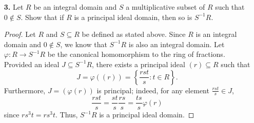 \documentclass[ 12pt ]{article}
\begin{document}
\begin{enumerate}
\begin{proof}
\begin{enumerate}
				Suppose by contradiction that $I = (x)$ where $x \in R$. It must hold that there exist $y, z \in R$ such that $$xy = 2\;\;\; \mathrm{and}\;\;\; xz = 1 + i\sqrt{5}.$$ Recall that the only units of $R$ are $-1$ and $1$. If $x$ is not unital, then $y$ and $z$ must be units; however, this implies that $$|x| = 2\;\;\; \mathrm{and}\;\;\; |x| = \sqrt{6}.$$ Hence, $x$ is a unit, yet $I \neq R$; indeed, using elementary arguments as utilized above would illustrate that $3 \notin I$, contradicting the fact that $I = (x) = R$.

				\item[\textbf{b.}] Consider an arbitrary element in $I \cdot I$: $$(2(a + bi\sqrt{5}) + (1 + i\sqrt{5})(c + di\sqrt{5}))(2(a' + b'i\sqrt{5}) + (1 + i\sqrt{5})(c' + d'i\sqrt{5})).$$ In the expanded binomial product, we can see that all are multiplies of $2$ and elements of $R$, except possibly $$(1 + i\sqrt{5})^2(c + di\sqrt{5})(c' + d'i\sqrt{5}).$$ After further expanding, $(1 + i\sqrt{5})^2 = 2(-2 + i\sqrt{5})$ and so the latter term is also a product of $2$ and the elements of $R$. Hence, $I \cdot I \subseteq (2)$. \\

				To show that $(2) \subseteq I \cdot I$, I was having difficulty continuing. It would appear that the minimal element of $I$ in regard to magnitude is $2$, then the least element from $I \cdot I$ would be $4$, and so $2 \notin I \cdot I$ which would contradict the fact that $I \cdot I = (2)$. There must be something wrong with my reasoning.
			\end{enumerate}
		\end{proof}



	\item[\textbf{3.}] Let $R$ be an integral domain and $S$ a multiplicative subset of $R$ such that $0 \notin S$. Show that if $R$ is a principal ideal domain, then so is $S^{-1}R$.

		\begin{proof}
			Let $R$ and $S \subseteq R$ be defined as stated above. Since $R$ is an integral domain and $0 \notin S$, we know that $S^{-1}R$ is also an integral domain. Let $\varphi : R \to S^{-1}R$ be the canonical homomorphism to the ring of fractions. Provided an ideal $J \subseteq S^{-1}R$, there exists a principal ideal $(r) \subseteq R$ such that $$J = \varphi((r)) = \left \{ \frac{rst}{s} : t \in R \right \}.$$ Furthermore, $J = (\varphi(r))$ is principal; indeed, for any element $\frac{rst}{s} \in J$, $$\frac{rst}{s} = \frac{st}{s} \frac{rs}{s} = \frac{ts}{s} \varphi(r)$$ since $rs^3t = rs^3t$. Thus, $S^{-1}R$ is a principal ideal domain.
		\end{proof}


\end{enumerate}
\end{document}
